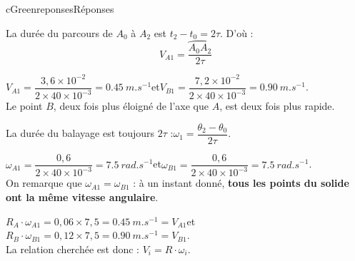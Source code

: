 \documentclass[11pt,a4paper]{article}
\newcommand{\arc}[1]{\overparen{#1}}
\begin{document}
\begin{rub}{cGreen}{reponses}{Réponses}
\begin{reps}
  \item La durée du parcours de $A_0$ à $A_2$ est $t_2 - t_0 = 2\tau$. D’où :
  \[ V_{A1} = \frac{\arc{A_0A_2}}{2\tau} \]
  \item $V_{A1} = \dfrac{3{,}6\times10^{-2}}{2\times40\times10^{-3}} = \qty{0,45}{m.s^{-1}}$\qquad et\qquad $V_{B1} = \dfrac{7{,}2\times10^{-2}}{2\times40\times10^{-3}} = \qty{0,90}{m.s^{-1}}$.\\
  Le point $B$, deux fois plus éloigné de l’axe que $A$, est deux fois plus rapide.
  \item La durée du balayage est toujours $2\tau$ :\quad $\omega_1 = \dfrac{\theta_2 - \theta_0}{2\tau}$.
  \item $\omega_{A1} = \dfrac{0{,}6}{2\times40\times10^{-3}} = \qty{7,5}{rad.s^{-1}}$\qquad et\qquad $\omega_{B1} = \dfrac{0{,}6}{2\times40\times10^{-3}} = \qty{7,5}{rad.s^{-1}}$.\\
  On remarque que $\omega_{A1} = \omega_{B1}$ : à un instant donné, \textbf{tous les points du solide ont la même vitesse angulaire}.
  \item $R_A\cdot\omega_{A1} = 0{,}06\times7{,}5 = \qty{0,45}{m.s^{-1}} = V_{A1}$\qquad et\qquad $R_B\cdot\omega_{B1} = 0{,}12\times7{,}5 = \qty{0,90}{m.s^{-1}} = V_{B1}$.\\
  La relation cherchée est donc : $V_i = R\cdot\omega_i$.
\end{reps}
\end{rub}
\end{document}
